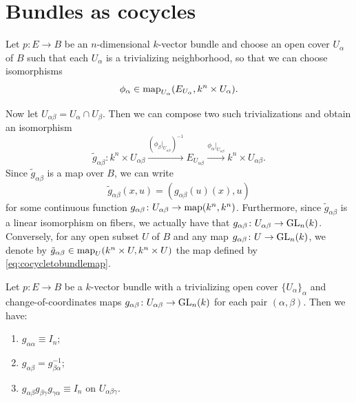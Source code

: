 \documentclass[a4paper,openany]{scrbook}
\begin{document}
\section{Bundles as cocycles}

Let $p\colon E \to B$ be an $n$-dimensional $k$-vector bundle and choose an open cover $U_\alpha$ of $B$ such that each $U_\alpha$ is a trivializing neighborhood, so that we can choose isomorphisms
\[
\phi_\alpha \in \operatorname{map}_{U_\alpha}(E_{U_\alpha},k^n \times U_{\alpha}).
\]

Now let $U_{\alpha\beta} = U_\alpha \cap U_\beta$. Then we can compose two such trivializations and obtain an isomorphism
\[
\tilde g_{\alpha\beta}\colon k^{n} \times U_{\alpha\beta} \xrightarrow{(\phi_\beta|_{U_{\alpha\beta}})^{-1}} E_{U_{\alpha\beta}} \xrightarrow{\phi_\alpha|_{U_{\alpha\beta}}} k^{n} \times U_{\alpha\beta}.
\]
Since $\tilde g_{\alpha\beta}$ is a map over $B$, we can write
\begin{equation}\label{eq:cocycletobundlemap}
\tilde g_{\alpha\beta}(x,u) = (g_{\alpha\beta}(u)(x),u)
\end{equation}
for some continuous function $g_{\alpha\beta}\colon U_{\alpha\beta} \to \operatorname{map}(k^{n},k^{n})$. Furthermore, since $\tilde g_{\alpha\beta}$ is a linear isomorphism on fibers, we actually have that $g_{\alpha\beta}\colon U_{\alpha\beta} \to \operatorname{GL}_{n}(k)$. Conversely, for any open subset $U$ of $B$ and any map $g_{\alpha\beta}\colon U \to \operatorname{GL}_n(k)$, we denote by $\tilde g_{\alpha\beta}\in \operatorname{map}_{U}(k^n \times U,k^n \times U)$ the map defined by \eqref{eq:cocycletobundlemap}.

\begin{lemma} \label{lemma:vectorbundlegivescocycle}
Let $p\colon E \to B$ be a $k$-vector bundle with a trivializing open cover $\{U_\alpha\}_\alpha$ and change-of-coordinates maps $g_{\alpha\beta}\colon U_{\alpha\beta} \to \operatorname{GL}_{n}(k)$ for each pair $(\alpha,\beta)$. Then we have:
\begin{enumerate}[label=\normalfont \bfseries{(COC\arabic*)},leftmargin=*]
\item $g_{\alpha\alpha} \equiv I_n$; \label{it:coc1}
\item $g_{\alpha\beta} = g_{\beta\alpha}^{-1}$; \label{it:coc2}
\item $g_{\alpha\beta} g_{\beta\gamma} g_{\gamma\alpha} \equiv I_n$ on $U_{\alpha\beta\gamma}$. \label{it:coc3}
\end{enumerate}
\end{lemma}
\end{document}
